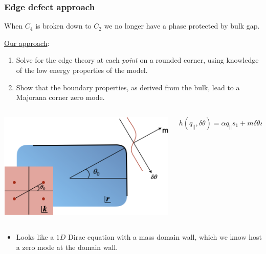 \documentclass{beamer}
\renewcommand{\(}{\left(}
\renewcommand{\)}{\right)}
\renewcommand{\[}{\left[}
\renewcommand{\]}{\right]}
\begin{document}
\begin{frame}
    \frametitle{Edge defect approach}
    \begin{framed}
        When $C_4$ is broken down to $C_2$ we no longer have a phase protected by bulk gap.
    \end{framed}
    \underline{Our approach}: 
    \begin{enumerate}
        \item Solve for the edge theory at each \emph{point} on a rounded corner, using knowledge of the low energy properties of the model. 
        \item Show that the boundary properties, as derived from the bulk, lead to a Majorana corner zero mode. 
    \end{enumerate}
    \begin{columns}[]
        \begin{column}{0.5\textwidth}
            \centering 
            \includegraphics[scale = 0.3]{corner_without_C4.png}
        \end{column}\pause
        \begin{column}{0.5\textwidth}
            \begin{framed}
                \centering
                $h(q_{||}, \delta \theta) = \alpha q_{||} s_1 + m \delta \theta s_2 $
            \end{framed}
        \end{column}
    \end{columns}
    \begin{itemize}
        \item Looks like a $1D$ Dirac equation with a mass domain wall, which we know host a zero mode at the domain wall. \citet*{Jackiw_Rebbi_1976}
    \end{itemize}
\end{frame}


\end{document}
